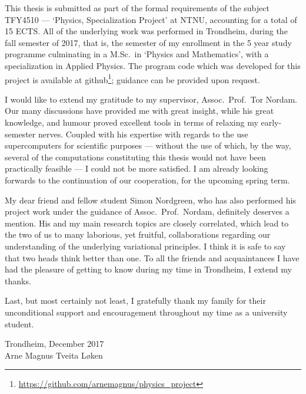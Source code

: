 This thesis is submitted as part of the formal requirements of the subject
TFY4510 --- `Physics, Specialization Project' at NTNU, accounting for a total
of 15 ECTS. All of the underlying work was performed in Trondheim, during the
fall semester of 2017, that is, the  semester of my enrollment in the
5 year study programme culminating in a M.Sc.\ in `Physics and Mathematics',
with a specialization in Applied Physics. The program code which was developed
for this project is available at
github\footnote{\url{https://github.com/arnemagnus/physics_project}}; guidance
can be provided upon request.
%

I would like to extend my gratitude to my supervisor, Assoc.\ Prof.\
Tor Nordam. Our many discussions have provided me with great insight, while
his great knowledge, and humour proved excellent tools in terms
of relaxing my early-semester nerves.
Coupled with his expertise with regards to the use supercomputers for scientific
purposes --- without the use of which, by the
way, several of the computations constituting this thesis would not have been
practically feasible --- I could not be more satisfied. I am already looking
forwards to the continuation of our cooperation, for the upcoming spring term.

My dear friend and fellow student Simon Nordgreen, who has also performed his
project work under the guidance of Assoc.\ Prof.\ Nordam, definitely
deserves a mention. His and my main research topics are closely correlated,
which lead to the two of us to many laborious, yet fruitful, collaborations
regarding our understanding of the underlying variational principles. I think it
is safe to say that two heads think better than one. To all the friends and
acquaintances I have had the pleasure of getting to know during my
time in Trondheim, I extend my thanks.

Last, but most certainly not least, I gratefully thank my family for their
unconditional support and encouragement throughout my time as a university
student.


\begin{minipage}[t]{\textwidth}
    \begin{flushright}
    Trondheim, December 2017\\
    Arne Magnus Tveita Løken
    \end{flushright}
\end{minipage}
